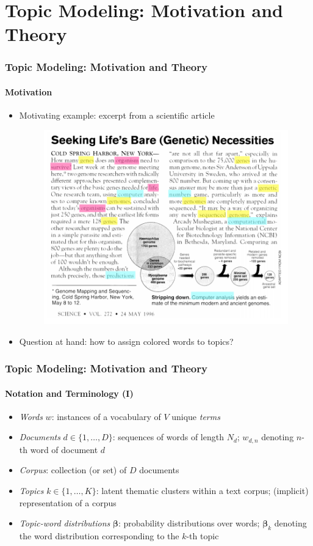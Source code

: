 \documentclass[xcolor=dvipsnames]{beamer}
\begin{document}
\section{Topic Modeling: Motivation and Theory}
\begin{frame}
\frametitle{Topic Modeling: Motivation and Theory}
\framesubtitle{Motivation}
\begin{itemize}
\item Motivating example: excerpt from a scientific article \parencite{blei2012presentation}
	\begin{figure}[h!]
  	\centering
  	\includegraphics[scale = 0.30]{../plots/presentation/motivation.png}
	\end{figure}
\item Question at hand: how to assign colored words to topics?
\end{itemize}
\end{frame}

\begin{frame}
\frametitle{Topic Modeling: Motivation and Theory}
\framesubtitle{Notation and Terminology (I)}
\begin{itemize}
\item \textit{Words} $w$: instances of a vocabulary of $V$ unique \textit{terms}
\item \textit{Documents} $d \in \{1,\dots,D\}$: sequences of words of length $N_{d}$; $w_{d,n}$ denoting $n$-th word of document $d$
\item \textit{Corpus}: collection (or set) of $D$ documents
\item \textit{Topics} $k \in \{1,\dots,K\}$: latent thematic clusters within a text corpus; (implicit) representation of a corpus
\item \textit{Topic-word distributions} $\boldsymbol{\beta}$: probability distributions over words; $\boldsymbol{\beta}_k$ denoting the word distribution corresponding to the $k$-th topic
\end{itemize}
\end{frame}
\end{document}
